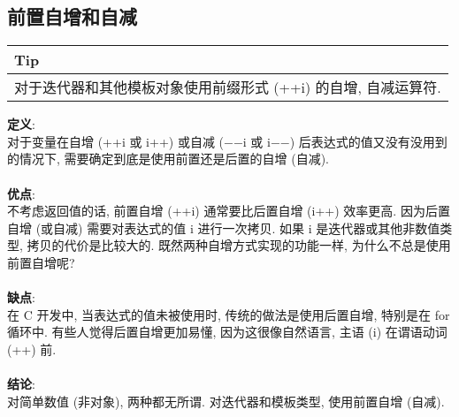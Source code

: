 \documentclass[a4paper,11pt,CJK]{article}
\begin{document}
\begin{CJK}{UTF8}{gbsn}
\subsection{前置自增和自减}
\begin{table}[htbp]
\flushleft
\begin{tabular}{p{400pt}}
\toprule
\rowcolor[gray]{.8} Tip \\
\midrule
对于迭代器和其他模板对象使用前缀形式 (++i) 的自增, 自减运算符.\\
\bottomrule
\end{tabular}
\end{table}
\noindent
\textbf{定义}:\\
\indent 对于变量在自增 (++i 或 i++) 或自减 ($-$$-$i 或 i$-$$-$) 后表达式的值又没有没用到的情况下, 需要确定到底是使用前置还是后置的自增 (自减).\\
\\
\textbf{优点}:\\
\indent 不考虑返回值的话, 前置自增 (++i) 通常要比后置自增 (i++) 效率更高. 因为后置自增 (或自减) 需要对表达式的值 i 进行一次拷贝. 如果 i 是迭代器或其他非数值类型, 拷贝的代价是比较大的. 既然两种自增方式实现的功能一样, 为什么不总是使用前置自增呢?\\
\\
\textbf{缺点}:\\
\indent 在 C 开发中, 当表达式的值未被使用时, 传统的做法是使用后置自增, 特别是在 for 循环中. 有些人觉得后置自增更加易懂, 因为这很像自然语言, 主语 (i) 在谓语动词 (++) 前.\\
\\
\textbf{结论}:\\
\indent 对简单数值 (非对象), 两种都无所谓. 对迭代器和模板类型, 使用前置自增 (自减).


\end{CJK}
\end{document}
